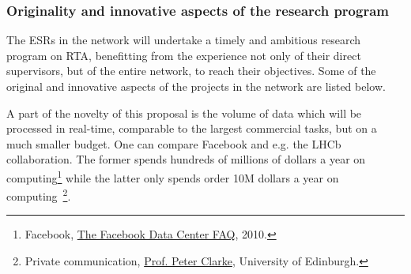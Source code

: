 \subsubsection{Originality and innovative aspects of the research program} 
\label{sub:Originality}

The ESRs in the \acronym network will undertake a timely and ambitious research program on RTA, benefitting from the experience not only of their direct supervisors, but of the entire network, to reach their objectives. Some of the original and innovative aspects of the projects in the network are listed below. 

A part of the novelty of this proposal is the volume of data which will be processed in real-time, comparable to the largest commercial tasks, but on a much smaller budget. 
One can compare Facebook and e.g. the LHCb collaboration.
The former 
spends hundreds of millions of dollars a year on computing\footnote{Facebook, \href{http://www.datacenterknowledge.com/the-facebook-data-center-faq-page-three/}{The Facebook Data Center FAQ}, 2010.} while the latter only 
spends order 10M dollars a year on computing~\footnote{Private communication, \href{mailto:peter.clarke@ed.ac.uk}{Prof. Peter Clarke}, University of Edinburgh.}. 
